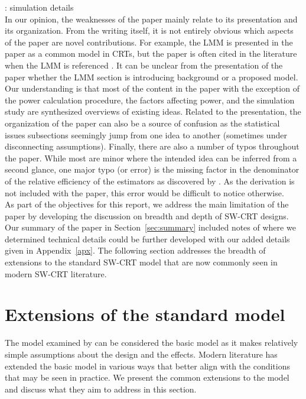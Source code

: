 \documentclass[10pt]{article}
\begin{document}
\todo: simulation details
\\

In our opinion, the weaknesses of the paper mainly relate to its presentation and its organization. From the writing itself, it is not entirely obvious which aspects of the paper are novel contributions. For example, the LMM is presented in the paper as a common model in CRTs, but the paper is often cited in the literature when the LMM is referenced \parencite[e.g.,][]{Harrison:2020,Bowden:2021,DavisPlourde:2021}. It can be unclear from the presentation of the paper whether the LMM section is introducing background or a proposed model. Our understanding is that most of the content in the paper with the exception of the power calculation procedure, the factors affecting power, and the simulation study are synthesized overviews of existing ideas. Related to the presentation, the organization of the paper can also be a source of confusion as the statistical issues subsections seemingly jump from one idea to another (sometimes under disconnecting assumptions). Finally, there are also a number of typos throughout the paper. While most are minor where the intended idea can be inferred from a second glance, one major typo (or error) is the missing factor in the denominator of the relative efficiency of the estimators as discovered by \textcite{Liao:2015}. As the derivation is not included with the paper, this error would be difficult to notice otherwise.
\\

As part of the objectives for this report, we address the main limitation of the paper by developing the discussion on breadth and depth of SW-CRT designs. Our summary of the paper in Section~\ref{sec:summary} included notes of where we determined technical details could be further developed with our added details given in Appendix~\ref{apx}. The following section addresses the breadth of extensions to the standard SW-CRT model that are now commonly seen in modern SW-CRT literature.


\section{Extensions of the standard model} \label{sec:extension}

The model examined by \textcite{Hussey:2007} can be considered the basic model as it makes relatively simple assumptions about the design and the effects. Modern literature has extended the basic model in various ways that better align with the conditions that may be seen in practice. We present the common extensions to the model and discuss what they aim to address in this section.
\end{document}
